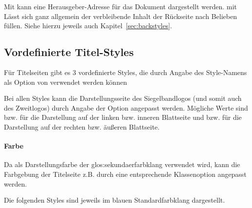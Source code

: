 Mit  kann eine Herausgeber-Adresse für das Dokument
dargestellt werden.
mit  Lässt sich ganz allgemein der verbleibende
Inhalt der Rückseite nach Belieben füllen.
Siehe hierzu jeweils auch Kapitel~\ref{sec:backstyles}.

\subsection{Vordefinierte Titel-Styles}\label{sec:titlestyles}


Für Titelseiten gibt es 3 vordefinierte Styles, die durch Angabe des
Style-Namens als Option von  verwendet werden können

\begin{Declaration}
\end{Declaration}

Bei allen Styles kann die Darstellungsseite des Siegelbandlogos
(und somit auch des Zweitlogos) durch Angabe der Option
 angepasst werden.
Mögliche Werte sind  bzw.  für die Darstellung
auf der linken bzw. inneren Blattseite und  bzw. 
für die Darstellung auf der rechten bzw. äußeren Blattseite.

\paragraph{Farbe}
Da als Darstellungsfarbe der \gls{glos:sekundaerfarbklang} verwendet wird,
kann die Farbgebung der Titelseite z.B. durch eine entsprechende Klassenoption
angepasst werden.

Die folgenden Styles sind jeweils im blauen Standardfarbklang dargestellt.


